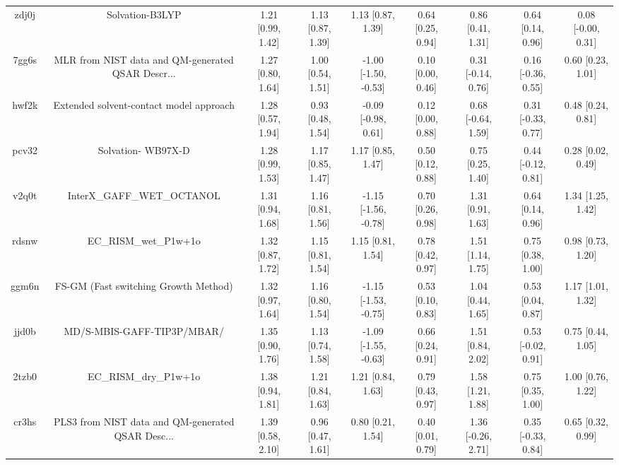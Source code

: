 \documentclass{article}
\begin{document}
\begin{center}
\begin{longtable}{|ccccccccc|}
 zdj0j &                                    Solvation-B3LYP &  1.21 [0.99, 1.42] &  1.13 [0.87, 1.39] &     1.13 [0.87, 1.39] &  0.64 [0.25, 0.94] &    0.86 [0.41, 1.31] &    0.64 [0.14, 0.96] &    0.08 [-0.00, 0.31] \\
 7gg6s &  MLR from NIST data and QM-generated QSAR Descr... &  1.27 [0.80, 1.64] &  1.00 [0.54, 1.51] &  -1.00 [-1.50, -0.53] &  0.10 [0.00, 0.46] &   0.31 [-0.14, 0.76] &   0.16 [-0.36, 0.55] &     0.60 [0.23, 1.01] \\
 hwf2k &            Extended solvent-contact model approach &  1.28 [0.57, 1.94] &  0.93 [0.48, 1.54] &   -0.09 [-0.98, 0.61] &  0.12 [0.00, 0.88] &   0.68 [-0.64, 1.59] &   0.31 [-0.33, 0.77] &     0.48 [0.24, 0.81] \\
 pcv32 &                                 Solvation- WB97X-D &  1.28 [0.99, 1.53] &  1.17 [0.85, 1.47] &     1.17 [0.85, 1.47] &  0.50 [0.12, 0.88] &    0.75 [0.25, 1.40] &   0.44 [-0.12, 0.81] &     0.28 [0.02, 0.49] \\
 v2q0t &                         InterX\_GAFF\_WET\_OCTANOL &  1.31 [0.94, 1.68] &  1.16 [0.81, 1.56] &  -1.15 [-1.56, -0.78] &  0.70 [0.26, 0.98] &    1.31 [0.91, 1.63] &    0.64 [0.14, 0.96] &     1.34 [1.25, 1.42] \\
 rdsnw &                              EC\_RISM\_wet\_P1w+1o &  1.32 [0.87, 1.72] &  1.15 [0.81, 1.54] &     1.15 [0.81, 1.54] &  0.78 [0.42, 0.97] &    1.51 [1.14, 1.75] &    0.75 [0.38, 1.00] &     0.98 [0.73, 1.20] \\
 ggm6n &               FS-GM (Fast switching Growth Method) &  1.32 [0.97, 1.64] &  1.16 [0.80, 1.54] &  -1.15 [-1.53, -0.75] &  0.53 [0.10, 0.83] &    1.04 [0.44, 1.65] &    0.53 [0.04, 0.87] &     1.17 [1.01, 1.32] \\
 jjd0b &                         MD/S-MBIS-GAFF-TIP3P/MBAR/ &  1.35 [0.90, 1.76] &  1.13 [0.74, 1.58] &  -1.09 [-1.55, -0.63] &  0.66 [0.24, 0.91] &    1.51 [0.84, 2.02] &   0.53 [-0.02, 0.91] &     0.75 [0.44, 1.05] \\
 2tzb0 &                              EC\_RISM\_dry\_P1w+1o &  1.38 [0.94, 1.81] &  1.21 [0.84, 1.63] &     1.21 [0.84, 1.63] &  0.79 [0.43, 0.97] &    1.58 [1.21, 1.88] &    0.75 [0.35, 1.00] &     1.00 [0.76, 1.22] \\
 cr3hs &  PLS3 from NIST data and QM-generated QSAR Desc... &  1.39 [0.58, 2.10] &  0.96 [0.47, 1.61] &     0.80 [0.21, 1.54] &  0.40 [0.01, 0.79] &   1.36 [-0.26, 2.71] &   0.35 [-0.33, 0.84] &     0.65 [0.32, 0.99] \\

\end{longtable}
\end{center}
\end{document}
